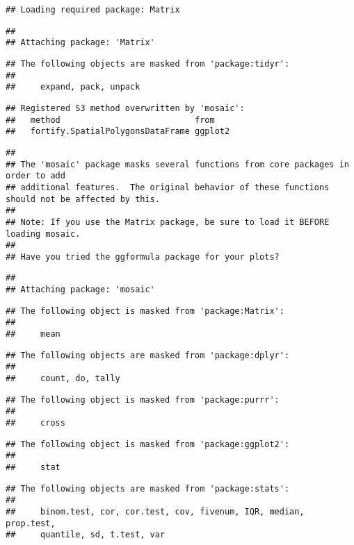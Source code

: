 \documentclass[
]{article}
\begin{document}
\begin{verbatim}
## Loading required package: Matrix
\end{verbatim}

\begin{verbatim}
## 
## Attaching package: 'Matrix'
\end{verbatim}

\begin{verbatim}
## The following objects are masked from 'package:tidyr':
## 
##     expand, pack, unpack
\end{verbatim}

\begin{verbatim}
## Registered S3 method overwritten by 'mosaic':
##   method                           from   
##   fortify.SpatialPolygonsDataFrame ggplot2
\end{verbatim}

\begin{verbatim}
## 
## The 'mosaic' package masks several functions from core packages in order to add 
## additional features.  The original behavior of these functions should not be affected by this.
## 
## Note: If you use the Matrix package, be sure to load it BEFORE loading mosaic.
## 
## Have you tried the ggformula package for your plots?
\end{verbatim}

\begin{verbatim}
## 
## Attaching package: 'mosaic'
\end{verbatim}

\begin{verbatim}
## The following object is masked from 'package:Matrix':
## 
##     mean
\end{verbatim}

\begin{verbatim}
## The following objects are masked from 'package:dplyr':
## 
##     count, do, tally
\end{verbatim}

\begin{verbatim}
## The following object is masked from 'package:purrr':
## 
##     cross
\end{verbatim}

\begin{verbatim}
## The following object is masked from 'package:ggplot2':
## 
##     stat
\end{verbatim}

\begin{verbatim}
## The following objects are masked from 'package:stats':
## 
##     binom.test, cor, cor.test, cov, fivenum, IQR, median, prop.test,
##     quantile, sd, t.test, var
\end{verbatim}
\end{document}
